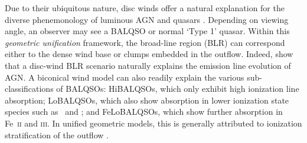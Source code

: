 \documentclass[useAMS,usenatbib]{mn2e_x}
\begin{document}
Due to their ubiquitous nature,
disc winds offer a natural explanation for the
diverse phenemonology of luminous AGN and quasars \citep[e.g.][]{MCGV95, elvis2000}. 
Depending on viewing angle, an observer 
may see a BALQSO or normal `Type 1' quasar.
Within this {\em geometric unification} framework, the broad-line region (BLR) can 
correspond either to the dense wind base or clumps embedded
in the outflow. Indeed, \cite{elitzur2014} show that a disc-wind BLR scenario
naturally explains the emission line evolution of AGN.
A biconical wind model can also readily explain the various sub-classifications of BALQSOs: 
HiBALQSOs, which only exhibit high ionization line absorption; LoBALQSOs, which also show
absorption in lower ionization state species such as \mg\ and \al; and
FeLoBALQSOs, which show further absorption in Fe~\textsc{ii} and \textsc{iii}.
In unified geometric models, this is generally attributed to ionization stratification
of the outflow \citep[e.g.][]{elvis2000}.

\end{document}
